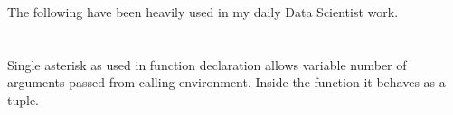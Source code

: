 \documentclass[letterpaper,12pt,english]{sphinxmanual}
\begin{document}
The following  have been heavily used in my daily Data Scientist work.


\section{\sphinxstyleliteralintitle{\sphinxupquote{*}}}
\label{\detokenize{primer:id1}}
Single asterisk as used in function declaration allows variable number of arguments passed from calling environment. Inside the function it behaves as a tuple.

\begin{quote}

\begin{sphinxVerbatim}[commandchars=\\\{\}]
  \PYG{p}{[}\PYG{p}{]}
\end{sphinxVerbatim}
\end{quote}

\begin{quote}

\begin{sphinxVerbatim}[commandchars=\\\{\}]
\PYG{p}{[}  \PYG{p}{]}
  
\end{sphinxVerbatim}
\end{quote}


\section{}
\label{\detokenize{primer:range}}
\begin{quote}

\begin{sphinxVerbatim}[commandchars=\\\{\}]
\end{sphinxVerbatim}
\end{quote}
\end{document}
